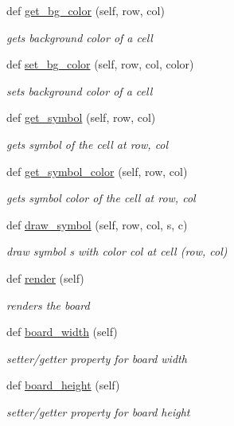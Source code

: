 \begin{DoxyCompactItemize}
def \hyperlink{classbridges_1_1gamebase_1_1_game_base_a2e1fd4365bf805a85c19bef1eb197b22}{get\+\_\+bg\+\_\+color} (self, row, col)
\begin{DoxyCompactList}\small\item\em gets background color of a cell \end{DoxyCompactList}\item 
def \hyperlink{classbridges_1_1gamebase_1_1_game_base_a669740699d8d3a848172febbfbfa174f}{set\+\_\+bg\+\_\+color} (self, row, col, color)
\begin{DoxyCompactList}\small\item\em sets background color of a cell \end{DoxyCompactList}\item 
def \hyperlink{classbridges_1_1gamebase_1_1_game_base_a80a3f5e32f8d0ad45c3f72d3c3e134e3}{get\+\_\+symbol} (self, row, col)
\begin{DoxyCompactList}\small\item\em gets symbol of the cell at row, col \end{DoxyCompactList}\item 
def \hyperlink{classbridges_1_1gamebase_1_1_game_base_a7cb6637713536701e89e870a5a3428a1}{get\+\_\+symbol\+\_\+color} (self, row, col)
\begin{DoxyCompactList}\small\item\em gets symbol color of the cell at row, col \end{DoxyCompactList}\item 
def \hyperlink{classbridges_1_1gamebase_1_1_game_base_a6c9a7b7e5d84874f42a6150ec25d3791}{draw\+\_\+symbol} (self, row, col, s, c)
\begin{DoxyCompactList}\small\item\em draw symbol s with color col at cell (row, col) \end{DoxyCompactList}\item 
def \hyperlink{classbridges_1_1gamebase_1_1_game_base_a3ae3bcb9702097029509d4123bc9276e}{render} (self)
\begin{DoxyCompactList}\small\item\em renders the board \end{DoxyCompactList}\item 
def \hyperlink{classbridges_1_1gamebase_1_1_game_base_a46a635c075e1a0a651e4caa18369494d}{board\+\_\+width} (self)
\begin{DoxyCompactList}\small\item\em setter/getter property for board width \end{DoxyCompactList}\item 
def \hyperlink{classbridges_1_1gamebase_1_1_game_base_ad1595582d3b02aa4225efed3beab935f}{board\+\_\+height} (self)
\begin{DoxyCompactList}\small\item\em setter/getter property for board height \end{DoxyCompactList}\end{DoxyCompactItemize}
